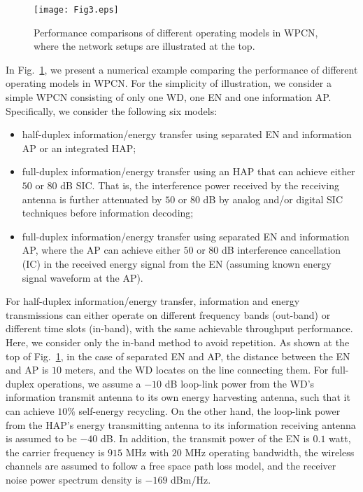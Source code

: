 \documentclass[journal, draftcls, one column, 12pt]{IEEEtran}
\begin{document}
\begin{figure}
\centering
  \begin{center}
    \texttt{[image: Fig3.eps]}
  \end{center}
  \caption{Performance comparisons of different operating models in WPCN, where the network setups are illustrated at the top.}
  \label{73}
\end{figure}

In Fig.~\ref{73}, we present a numerical example comparing the performance of different operating models in WPCN. For the simplicity of illustration, we consider a simple WPCN consisting of only one WD, one EN and one information AP. Specifically, we consider the following six models:
\begin{itemize}
  \item half-duplex information/energy transfer using separated EN and information AP or an integrated HAP;
  \item full-duplex information/energy transfer using an HAP that can achieve either $50$ or $80$ dB SIC. That is, the interference power received by the receiving antenna is further attenuated by $50$ or $80$ dB by analog and/or digital SIC techniques before information decoding;
  \item full-duplex information/energy transfer using separated EN and information AP, where the AP can achieve either $50$ or $80$ dB interference cancellation (IC) in the received energy signal from the EN (assuming known energy signal waveform at the AP).
\end{itemize}
For half-duplex information/energy transfer, information and energy transmissions can either operate on different frequency bands (out-band) or different time slots (in-band), with the same achievable throughput performance. Here, we consider only the in-band method to avoid repetition. As shown at the top of Fig.~\ref{73}, in the case of separated EN and AP, the distance between the EN and AP is $10$ meters, and the WD locates on the line connecting them. For full-duplex operations, we assume a $-10$ dB loop-link power from the WD's information transmit antenna to its own energy harvesting antenna, such that it can achieve $10\%$ self-energy recycling. On the other hand, the loop-link power from the HAP's energy transmitting antenna to its information receiving antenna is assumed to be $-40$ dB. In addition, the transmit power of the EN is $0.1$ watt, the carrier frequency is $915$ MHz with $20$ MHz operating bandwidth, the wireless channels are assumed to follow a free space path loss model, and the receiver noise power spectrum density is $-169$ dBm/Hz.
\end{document}
